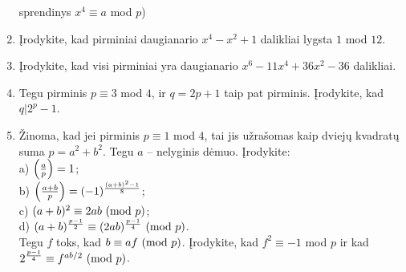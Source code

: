 \begin{enumerate}
    sprendinys $x^4 \equiv a$ mod $p$) 
  \item Įrodykite, kad pirminiai daugianario $x^4 - x^2 + 1$ dalikliai
    lygsta $1$ mod $12$. 
  \item Įrodykite, kad visi pirminiai yra daugianario $x^6 - 11x^4 + 36x^2
    - 36$ dalikliai.
  \item Tegu pirminis $p\equiv 3$ mod $4$, ir $q=2p+1$ taip pat pirminis.
    Įrodykite, kad $q|2^p -1$.
  \item Žinoma, kad jei pirminis $p \equiv 1$ mod $4$, tai jis užrašomas kaip
    dviejų kvadratų suma $p = a^2 + b^2$. Tegu $a$ -- nelyginis dėmuo.
    Įrodykite: \\
      a) $\left(\frac{a}{p}\right) = 1$;\\
      b) $\left(\frac{a+b}{p}\right) = (-1)^\frac{(a+b)^2 - 1}{8}$;\\
      c) $(a+b)^2 \equiv 2ab\ (\text{mod } p)$;\\
      d) $(a+b)^\frac{p-1}{2} \equiv (2ab)^\frac{p-1}{4}\ (\text{mod } p)$.\\
    Tegu $f$ toks, kad $b\equiv af \ (\text{mod } p)$. Įrodykite, kad $f^2 \equiv -1$
    mod $p$ ir kad $2^\frac{p-1}{4} \equiv f^{ab/2} \ (\text{mod } p)$. 


\end{enumerate}
